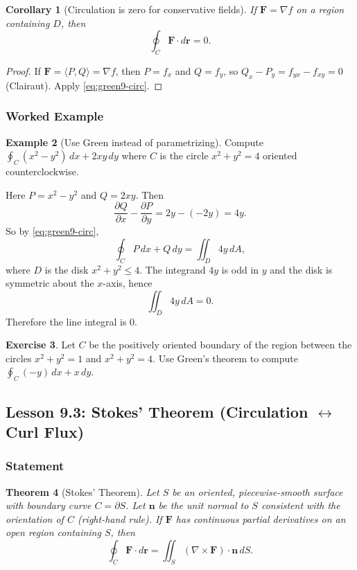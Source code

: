 \documentclass[12pt]{article}
\numberwithin{equation}{section}
\newcommand{\vect}[1]{\boldsymbol{#1}}   %
\theoremstyle{plain}
\newtheorem{theorem}{Theorem}[section]
\newtheorem{corollary}[theorem]{Corollary}
\theoremstyle{definition}
\newtheorem{example}[theorem]{Example}
\newtheorem{exercise}[theorem]{Exercise}
\theoremstyle{remark}
\begin{document}
\begin{corollary}[Circulation is zero for conservative fields]\label{cor:green-conservative}
If $\vect F=\nabla f$ on a region containing $D$, then
\[
\oint_C \vect F\cdot d\vect r=0.
\]
\end{corollary}

\begin{proof}
If $\vect F=\langle P,Q\rangle=\nabla f$, then $P=f_x$ and $Q=f_y$, so $Q_x-P_y=f_{yx}-f_{xy}=0$ (Clairaut). Apply \cref{eq:green9-circ}.
\end{proof}

\subsubsection{Worked Example}

\begin{example}[Use Green instead of parametrizing]\label{ex:green9-example}
Compute $\displaystyle \oint_C (x^2-y^2)\,dx + 2xy\,dy$ where $C$ is the circle $x^2+y^2=4$ oriented counterclockwise.

Here $P=x^2-y^2$ and $Q=2xy$. Then
\[
\frac{\partial Q}{\partial x}-\frac{\partial P}{\partial y}=2y-(-2y)=4y.
\]
So by \cref{eq:green9-circ},
\[
\oint_C P\,dx+Q\,dy=\iint_D 4y\,dA,
\]
where $D$ is the disk $x^2+y^2\le 4$. The integrand $4y$ is odd in $y$ and the disk is symmetric about the $x$-axis, hence
\[
\iint_D 4y\,dA=0.
\]
Therefore the line integral is $0$.
\end{example}

\begin{exercise}
Let $C$ be the positively oriented boundary of the region between the circles $x^2+y^2=1$ and $x^2+y^2=4$.
Use Green's theorem to compute $\displaystyle \oint_C (-y)\,dx + x\,dy$.
\end{exercise}

\subsection{Lesson 9.3: Stokes' Theorem (Circulation $\leftrightarrow$ Curl Flux)}

\subsubsection{Statement}

\begin{theorem}[Stokes' Theorem]\label{thm:stokes9}
Let $S$ be an oriented, piecewise-smooth surface with boundary curve $C=\partial S$.
Let $\vect n$ be the unit normal to $S$ consistent with the orientation of $C$ (right-hand rule).
If $\vect F$ has continuous partial derivatives on an open region containing $S$, then
\begin{equation}\label{eq:stokes9}
\oint_{C} \vect F\cdot d\vect r
=
\iint_{S} (\nabla\times \vect F)\cdot \vect n\,dS.
\end{equation}
\end{theorem}
\end{document}
